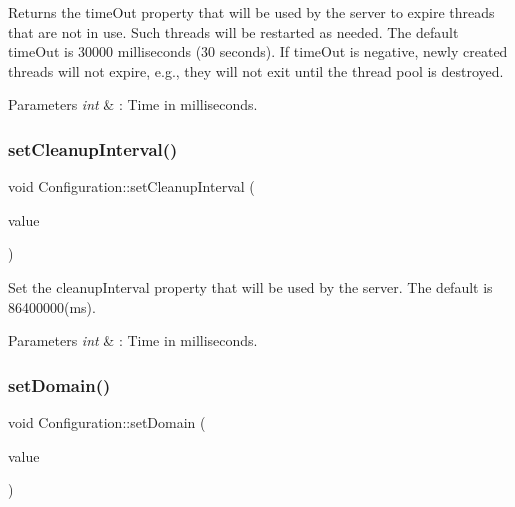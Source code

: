 Returns the time\+Out property that will be used by the server to expire threads that are not in use. Such threads will be restarted as needed. The default time\+Out is 30000 milliseconds (30 seconds). If time\+Out is negative, newly created threads will not expire, e.\+g., they will not exit until the thread pool is destroyed. 


\begin{DoxyParams}{Parameters}
{\em int} & \+: Time in milliseconds. \\
\hline
\end{DoxyParams}
\mbox{\label{class_configuration_a5d6a822ffd2c3c029ae1864f8358a592}} 
\subsubsection{\texorpdfstring{set\+Cleanup\+Interval()}{setCleanupInterval()}}
{\footnotesize\ttfamily void Configuration\+::set\+Cleanup\+Interval (\begin{DoxyParamCaption}\item[{int}]{value }\end{DoxyParamCaption})}



Set the cleanup\+Interval property that will be used by the server. The default is 86400000(ms). 


\begin{DoxyParams}{Parameters}
{\em int} & \+: Time in milliseconds. \\
\hline
\end{DoxyParams}
\mbox{\label{class_configuration_af31a608106ec376f01acc028ccb09cb8}} 
\subsubsection{\texorpdfstring{set\+Domain()}{setDomain()}}
{\footnotesize\ttfamily void Configuration\+::set\+Domain (\begin{DoxyParamCaption}\item[{const Q\+String \&}]{value }\end{DoxyParamCaption})}



